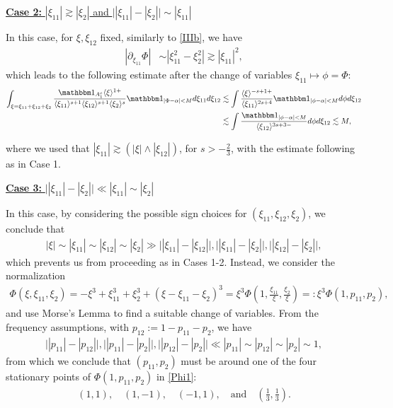 \documentclass[a4paper,
11pt,  reqno]{amsart}
\newcommand{\5}{\textup{V}}
\newcommand{\noi}{\noindent}
\newcommand{\ind}{\mathbbm 1}
\newcommand{\les}{\lesssim}
\theoremstyle{remark}
\newcommand{\al}{\alpha}
\newcommand{\ges}{\gtrsim}
\newcommand{\jb}[1]
{\langle #1 \rangle}
\numberwithin{equation}{section}
\numberwithin{theorem}{section}
\begin{document}
\smallskip
\noi
\underline{\textbf{Case 2:} $|\xi_{11}| \ges |\xi_2|$ and $\big| |\xi_{11}| - |\xi_2| \big| \sim |\xi_{11}|$}



In this case, for $\xi, \xi_{12}$ fixed, similarly to \eqref{IIIb}, we have
\begin{align}
|
\partial_{\xi_{11}} \Phi|
&
\sim |\xi_{11}^2 - \xi_2^2| \ges |\xi_{11}|^2,
\end{align}
which leads to the following estimate after the change of variables $\xi_{11} \mapsto \phi = \Phi$:
\begin{align}
\int_{\xi=\xi_{11} + \xi_{12} + \xi_2} \frac{\ind_{A_1^c}
\jb{\xi}^{ 1+}}{ \jb{\xi_{11}}^{s+1} \jb{\xi_{12}}^{s+1} \jb{\xi_2}^s}
\ind_{|\Phi - \al| < M}
d\xi_{11}  d\xi_{12}
&
\les \int \frac{\jb{\xi}^{ - s + 1 +} }{ \jb{\xi_{11}}^{2s+4}  } \ind_{|\phi - \al | < M } d\phi d\xi_{12}
\\
&
\les \int \frac{\ind_{|\phi - \al|< M }}{ \jb{\xi_{12}}^{3s + 3 -} } d\phi d\xi_{12}
\les M,
\end{align}



\noi
where we used that $|\xi_{11}| \ges (|\xi| \land |\xi_{12}|)$, for $s>-\frac23$, with the estimate following as in Case 1.



\smallskip

\noi
\underline{\textbf{Case 3:}  $\big| |\xi_{11}| - |\xi_2| \big| \ll |\xi_{11}| \sim |\xi_2|$}

In this case, by considering the possible sign choices for $(\xi_{11}, \xi_{12}, \xi_2)$, we conclude that
\begin{align}
|\xi| \sim |\xi_{11}| \sim |\xi_{12}| \sim |\xi_2| \gg \big| |\xi_{11}| -| \xi_{12}| \big|, \big| |\xi_{11}| -| \xi_{2}| \big|, \big| |\xi_{12}| -| \xi_{2}| \big| ,
\end{align}
which prevents us from proceeding as in Cases 1-2. Instead, we consider the normalization
\begin{align}\label{Phi1}
\Phi(\xi, \xi_{11}, \xi_2) = - \xi^3 + \xi_{11}^3 +  \xi_2^3 + (\xi - \xi_{11} - \xi_2)^3  = \xi^3 \Phi(1, \tfrac{\xi_{11}}{\xi}, \tfrac{\xi_2}{\xi}) =: \xi^3 \Phi(1, p_{11}, p_2),
\end{align}
and use Morse's Lemma to find a suitable change of variables.
From the frequency assumptions, with $p_{12}:= 1 - p_{11} - p_2$, we have
\begin{align}
\big| |p_{11}| - |p_{12}| \big|,
\big| |p_{11}| - |p_2| \big|,
\big| |p_{12}| - |p_2| \big|
 \ll |p_{11}| \sim |p_{12} | \sim |p_2|  \sim 1,
\end{align}
from which we conclude that
$(p_{11}, p_2)$ must be around one of the four stationary points of $\Phi(1, p_{11}, p_2)$ in \eqref{Phi1}:
\begin{align}
(1, 1),
\quad
(1, -1),
\quad
(-1,1),
\quad
\text{and}
\quad
(\tfrac13, \tfrac13).
\end{align}
\end{document}
